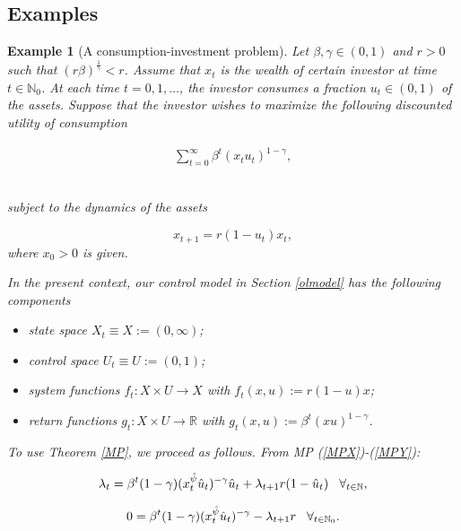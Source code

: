 \documentclass[3p]{elsarticle}
\newcommand{\rz}{\mathbb R}
\newcommand{\nat}{\mathbb N_0}
\newcommand{\natu}{\mathbb N}
\newtheorem{examp}[thm]{Example}
\begin{document}
	\subsection{Examples} 
	\begin{examp}[A consumption-investment problem]
		Let $\beta,\gamma\in(0,1)$ and $r>0$ such that  $\displaystyle (r\beta)^{\frac{1}{\gamma}}<r$. Assume that $x_t$ is the wealth of certain investor at time $t\in\nat$. At each time $t=0,1,\dots$, the investor consumes a fraction $u_t\in(0,1)$ of the assets. Suppose that the investor wishes to maximize the following discounted utility of consumption
		
		\begin{align*}
		\sum_{t=0}^\infty \beta^t(x_tu_t)^{1-\gamma},
		\end{align*}\
		
		subject to the dynamics of the assets
		
		$$x_{t+1}=r(1-u_t)x_t,$$ where $x_0>0$ is given.
		
		In the present context, our control model in Section \ref{olmodel} has the following components
		
		\begin{itemize}
			\item state space $X_t\equiv X:=(0,\infty)$;
			\item control space $U_t\equiv U:=(0,1)$;
			\item system functions $f_t:X\times U\to X$ with $f_t(x,u):=r(1-u)x$;
			\item return functions $g_t:X\times U\to \rz$ with $g_t(x,u):=\beta^t (xu)^{1-\gamma}$.
		\end{itemize}
		
		
		
		
		
		To use Theorem \ref{MP}, we proceed as follows. From MP (\ref{MPX})-(\ref{MPY}):
		
		
		
		\begin{align}
		\lambda_t=\beta^t(1-\gamma)(x_t^{\hat\psi}\hat u_t)^{-\gamma}\hat u_t+\lambda_{t+1}r(1-\hat u_t) \hspace{0.3cm}\forall_{t\in\natu},
		\end{align}
		
		\begin{align}
		0=\beta^t(1-\gamma)(x_t^{\hat \psi} \hat u_t)^{-\gamma}-\lambda_{t+1}r \hspace{0.3cm}\forall_{t\in\nat}.
		\end{align} 
		

\end{examp}
\end{document}
